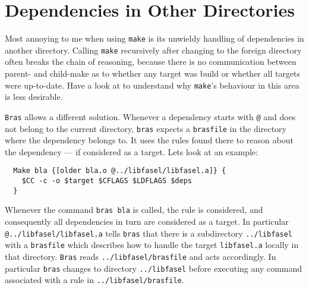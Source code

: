 \documentclass[11pt]{scrartcl}
\newcommand{\bras}{\texttt{bras}}
\newcommand{\Bras}{\texttt{Bras}}
\newcommand{\make}{\texttt{make}}
\begin{document}



\section{Dependencies in Other Directories}
\label{secForeignDeps}

Most annoying to me when using \make{} is its unwieldy handling of
dependencies in another directory. Calling \make{} recursively after
changing to the foreign directory often breaks the chain of reasoning,
because there is no communication between parent- and child-make as to
whether any target was build or whether all targets were
up-to-date. Have a look at \cite{Mil97} to understand why \make's
behaviour in this area is less desirable.

\Bras{} allows a different solution. Whenever a dependency starts with
\texttt{@} and does not belong to the current directory, \bras{} expects
a \texttt{brasfile} in the directory where the dependency belongs
to. It uses the rules found there to reason about the dependency ---
if considered as a target. Lets look at an example:

\begin{verbatim}
  Make bla {[older bla.o @../libfasel/libfasel.a]} {
    $CC -c -o $target $CFLAGS $LDFLAGS $deps
  }
\end{verbatim}

Whenever the command \texttt{bras bla} is called, the rule is
considered, and consequently all dependencies in turn are considered
as a target. In particular \texttt{@../libfasel/lib\-fasel.a} tells
\bras{} that there is a subdirectory \texttt{../libfasel} with a
\texttt{brasfile} which describes how to handle the target
\texttt{libfasel.a} locally in that directory. \Bras{} reads
\texttt{../libfasel/bras\-file} and acts accordingly. In particular
\bras{} changes to directory \texttt{../libfasel} before executing any
command associated with a rule in \texttt{../libfasel/brasfile}.
\end{document}
